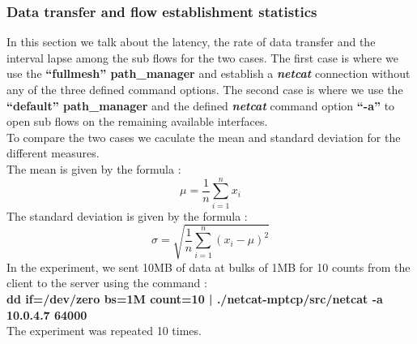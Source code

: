 \documentclass[a4paper,11pt]{article}
\begin{document}
			\subsubsection{Data transfer and flow establishment statistics}
			\label{subsubsec:datatransferandflowestablish}
			In this section we talk about the latency, the rate of data transfer and the interval lapse among the sub flows for the two cases. The first case is where we use the \textbf{``fullmesh'' path\_manager} and establish a \textbf{\emph{netcat}} connection without any of the three defined command options. The second case is where we use the \textbf{``default'' path\_manager} and the defined \textbf{\emph{netcat}} command option \textbf{``-a''} to open sub flows on the remaining available interfaces. \\

			To compare the two cases we caculate the mean and standard deviation for the different measures. \\

			The mean is given by the formula :
			$$\mu = \frac{1}{n}\sum_{i=1}^{n}x_i$$
			The standard deviation is given by the formula :
			$$\sigma = \sqrt{\frac{1}{n}\sum_{i=1}^{n}(x_i - \mu)^2}$$
			In the experiment, we sent 10MB of data at bulks of 1MB for 10 counts from the client to the server using the command : \\
			\textbf{dd if=/dev/zero bs=1M count=10 | ./netcat-mptcp/src/netcat -a 10.0.4.7 64000} \\
			The experiment was repeated 10 times.
\end{document}
